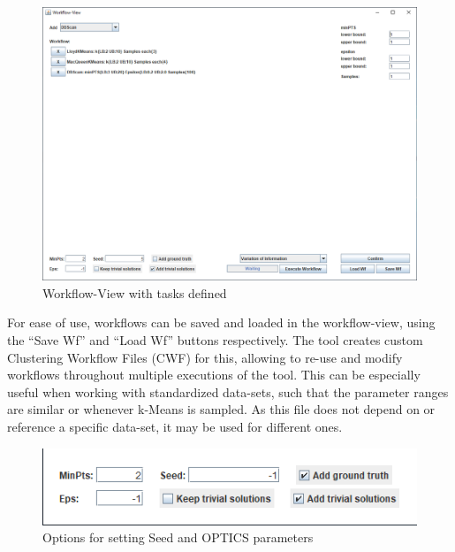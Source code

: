\documentclass[
	a4paper,
	english,
	twoside,
	openright,               
	11pt                            
	]{report}
\begin{document}
\begin{figure}[h]
	\centering
	\includegraphics[scale=.5]{workflow-view-tasks}
	\caption{Workflow-View with tasks defined}
	\label{fig:workflow-view-tasks}
\end{figure}

For ease of use, workflows can be saved and loaded in the workflow-view, using the ``Save Wf'' and ``Load Wf'' buttons respectively. The tool creates custom Clustering Workflow Files (CWF) for this, allowing to re-use and modify workflows throughout multiple executions of the tool. This can be especially useful when working with standardized data-sets, such that the parameter ranges are similar or whenever k-Means is sampled. As this file does not depend on or reference a specific data-set, it may be used for different ones.

\begin{figure}[h]
	\centering
	\includegraphics[scale=.8]{workflow-options}
	\caption{Options for setting Seed and OPTICS parameters}
	\label{fig:workflow-options}
\end{figure}
\end{document}
